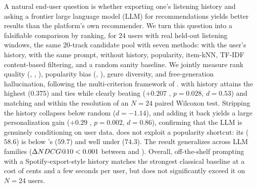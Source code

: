 A natural end-user question is whether exporting one's listening history and asking a frontier large language model (LLM) for recommendations yields better results than the platform's own recommender. We turn this question into a falsifiable comparison by ranking, for $24$ users with real held-out listening windows, the same $20$-track candidate pool with seven methods: \claude with the user's history, \gpt with the same prompt, \claude without history, popularity, item-kNN, TF-IDF content-based filtering, and a random sanity baseline. We jointly measure rank quality (\recall, \ndcg, \mrr), popularity bias (\arp, \longtail), genre diversity, and free-generation hallucination, following the multi-criterion framework of \citet{epure2025music}. \claude with history attains the highest \ndcg ($0.375$) and ties \gpt while clearly beating \popmethod ($+0.207$ \ndcg, $p{=}0.028$, $d{=}0.53$) and matching \cbf and \itemknn within the resolution of an $N{=}24$ paired Wilcoxon test. Stripping the history collapses \claude below random ($d{=}-1.14$), and adding it back yields a large personalization gain ($+0.29$ \ndcg, $p{=}0.002$, $d{=}0.86$), confirming that the LLM is genuinely conditioning on user data. \claude does not exploit a popularity shortcut: its \arp ($58.6$) is below \cbf's ($59.7$) and well under \popmethod ($74.3$). The result generalizes across LLM families ($\Delta NDCG@10 < 0.001$ between \claude and \gpt). Overall, off-the-shelf prompting with a Spotify-export-style history matches the strongest classical baseline at a cost of cents and a few seconds per user, but does not significantly exceed it on $N{=}24$ users.
